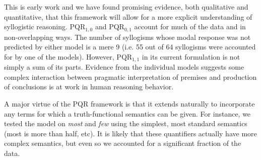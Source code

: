 \documentclass[10pt,letterpaper]{article}
\begin{document}




This is early work and we have found promising evidence, both qualitative and quantitative, that this framework will allow for a more explicit understanding of syllogistic reasoning. 
PQR$_{1,0}$ and PQR$_{0,1}$ account for much of the data and in non-overlapping ways. The number of syllogisms whose modal response was not predicted by either model is a mere 9 (i.e. 55 out of 64 syllogisms were accounted for by one of the models). However, PQR$_{1,1}$ in its current formulation is not simply a sum of its parts. Evidence from the individual models suggests some complex interaction between pragmatic interpretation of premises and production of conclusions is at work in human reasoning behavior. 

A major virtue of the PQR framework is that it extends naturally to incorporate any terms for which a truth-functional semantics can be given.
For instance, we tested the model on \emph{most} and \emph{few} using the simplest, most standard semantics (most is more than half, etc). It is likely that these quantifiers actually have more complex semantics, but even so we accounted for a significant fraction of the data.
\end{document}
